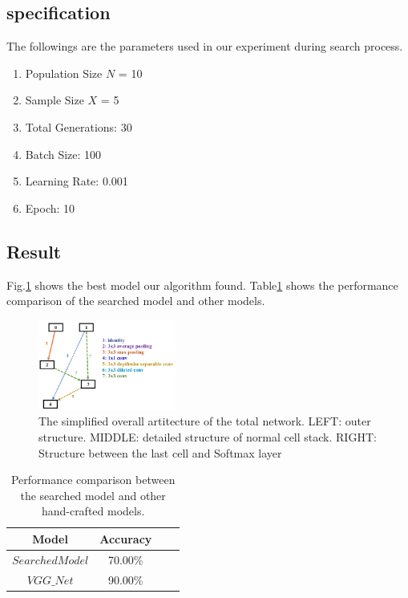 \documentclass[conference]{IEEEtran}
\begin{document}
 \subsection{specification}
 The followings are the parameters used in our experiment during search process.
 \begin{enumerate}
  \item Population Size $N$ = 10
  \item Sample Size $X$ = 5
  \item Total Generations: 30
  \item Batch Size: 100
  \item Learning Rate: 0.001
  \item Epoch: 10
 \end{enumerate}

 \subsection{Result}

 Fig.\ref{found_artc} shows the best model our algorithm found. Table\ref{table:1} shows the performance comparison of the searched model and other models.

\begin{figure}[H]
 	\centering
 	\includegraphics[width=0.4\textwidth]{figures/cellStruct.png}
   \caption{The simplified overall artitecture of the total network. LEFT: outer structure. MIDDLE: detailed structure of normal cell stack. RIGHT: Structure between the last cell and Softmax layer}\label{fig:digit}
   \label{found_artc}
  \end{figure}

  \begin{table}[H]
    
    \centering
      \begin{tabular}{cccc}
      \toprule
      Model&Accuracy\\
      \midrule
      $Searched  Model$&70.00\%\\
      $VGG\_Net$&90.00\%\\
  \bottomrule
  \end{tabular}
  \caption{Performance comparison between the searched model and other hand-crafted models.}
  \label{table:1}
  \end{table}
\end{document}
